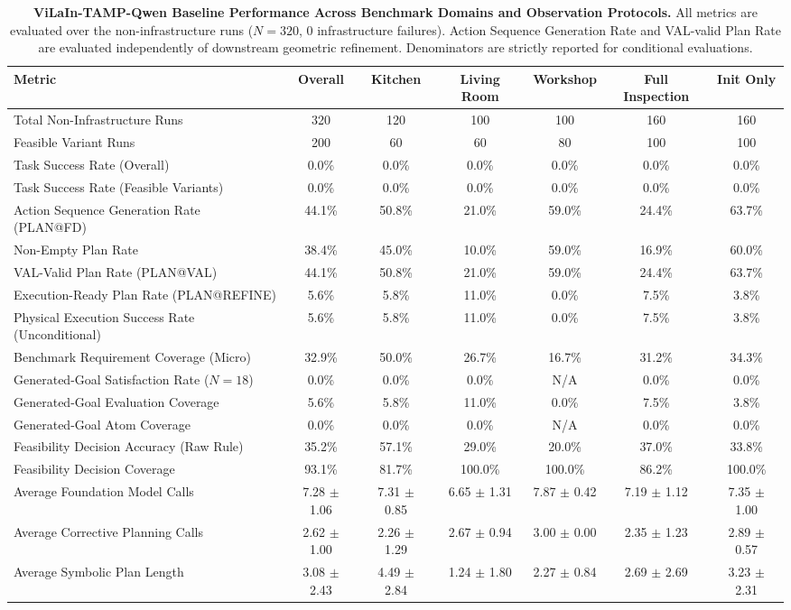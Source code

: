 \begin{table}[t]
\centering
\small
\caption{\textbf{ViLaIn-TAMP-Qwen Baseline Performance Across Benchmark Domains and Observation Protocols.}
All metrics are evaluated over the non-infrastructure runs ($N=320$, 0 infrastructure failures).
Action Sequence Generation Rate and VAL-valid Plan Rate are evaluated independently of downstream geometric refinement.
Denominators are strictly reported for conditional evaluations.}
\label{tab:vilain_qwen_main}
\begin{tabular}{l|c|ccc|cc}
\hline
\textbf{Metric} & \textbf{Overall} & \textbf{Kitchen} & \textbf{Living Room} & \textbf{Workshop} & \textbf{Full Inspection} & \textbf{Init Only} \\
\hline
Total Non-Infrastructure Runs & 320 & 120 & 100 & 100 & 160 & 160 \\
Feasible Variant Runs & 200 & 60 & 60 & 80 & 100 & 100 \\
\hline
Task Success Rate (Overall) & 0.0\% & 0.0\% & 0.0\% & 0.0\% & 0.0\% & 0.0\% \\
Task Success Rate (Feasible Variants) & 0.0\% & 0.0\% & 0.0\% & 0.0\% & 0.0\% & 0.0\% \\
Action Sequence Generation Rate (PLAN@FD) & 44.1\% & 50.8\% & 21.0\% & 59.0\% & 24.4\% & 63.7\% \\
Non-Empty Plan Rate & 38.4\% & 45.0\% & 10.0\% & 59.0\% & 16.9\% & 60.0\% \\
VAL-Valid Plan Rate (PLAN@VAL) & 44.1\% & 50.8\% & 21.0\% & 59.0\% & 24.4\% & 63.7\% \\
Execution-Ready Plan Rate (PLAN@REFINE) & 5.6\% & 5.8\% & 11.0\% & 0.0\% & 7.5\% & 3.8\% \\
Physical Execution Success Rate (Unconditional) & 5.6\% & 5.8\% & 11.0\% & 0.0\% & 7.5\% & 3.8\% \\
Benchmark Requirement Coverage (Micro) & 32.9\% & 50.0\% & 26.7\% & 16.7\% & 31.2\% & 34.3\% \\
Generated-Goal Satisfaction Rate ($N=18$) & 0.0\% & 0.0\% & 0.0\% & N/A & 0.0\% & 0.0\% \\
Generated-Goal Evaluation Coverage & 5.6\% & 5.8\% & 11.0\% & 0.0\% & 7.5\% & 3.8\% \\
Generated-Goal Atom Coverage & 0.0\% & 0.0\% & 0.0\% & N/A & 0.0\% & 0.0\% \\
\hline
Feasibility Decision Accuracy (Raw Rule) & 35.2\% & 57.1\% & 29.0\% & 20.0\% & 37.0\% & 33.8\% \\
Feasibility Decision Coverage & 93.1\% & 81.7\% & 100.0\% & 100.0\% & 86.2\% & 100.0\% \\
\hline
Average Foundation Model Calls & 7.28 $\pm$ 1.06 & 7.31 $\pm$ 0.85 & 6.65 $\pm$ 1.31 & 7.87 $\pm$ 0.42 & 7.19 $\pm$ 1.12 & 7.35 $\pm$ 1.00 \\
Average Corrective Planning Calls & 2.62 $\pm$ 1.00 & 2.26 $\pm$ 1.29 & 2.67 $\pm$ 0.94 & 3.00 $\pm$ 0.00 & 2.35 $\pm$ 1.23 & 2.89 $\pm$ 0.57 \\
Average Symbolic Plan Length & 3.08 $\pm$ 2.43 & 4.49 $\pm$ 2.84 & 1.24 $\pm$ 1.80 & 2.27 $\pm$ 0.84 & 2.69 $\pm$ 2.69 & 3.23 $\pm$ 2.31 \\
\hline
\end{tabular}
\end{table}
